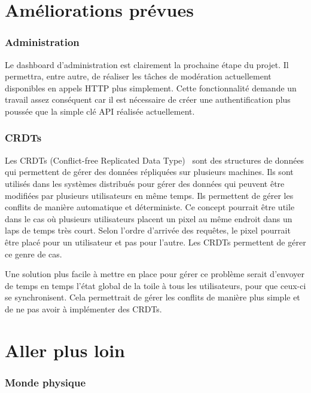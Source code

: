
\section{Améliorations prévues}

\subsubsection{Administration}

Le dashboard d'administration est clairement la prochaine étape du projet. Il permettra, entre autre, de réaliser les tâches de modération actuellement disponibles en appels HTTP plus simplement. Cette fonctionnalité demande un travail assez conséquent car il est nécessaire de créer une authentification plus poussée que la simple clé API réalisée actuellement.

\subsubsection{CRDTs}

Les CRDTs (Conflict-free Replicated Data Type)~\cite{crdt} sont des structures de données qui permettent de gérer des données répliquées sur plusieurs machines. Ils sont utilisés dans les systèmes distribués pour gérer des données qui peuvent être modifiées par plusieurs utilisateurs en même temps. Ils permettent de gérer les conflits de manière automatique et déterministe. Ce concept pourrait être utile dans le cas où plusieurs utilisateurs placent un pixel au même endroit dans un laps de temps très court. Selon l'ordre d'arrivée des requêtes, le pixel pourrait être placé pour un utilisateur et pas pour l'autre. Les CRDTs permettent de gérer ce genre de cas.

Une solution plus facile à mettre en place pour gérer ce problème serait d'envoyer de temps en temps l'état global de la toile à tous les utilisateurs, pour que ceux-ci se synchronisent. Cela permettrait de gérer les conflits de manière plus simple et de ne pas avoir à implémenter des CRDTs.

\section{Aller plus loin}

\subsubsection{Monde physique}

